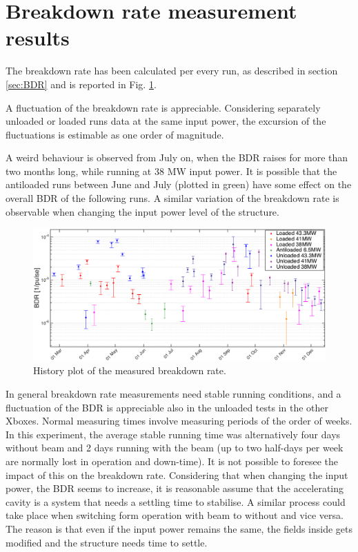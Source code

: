 \section[Breakdown rate measurement results]{Breakdown rate measurement results}

The breakdown rate has been calculated per every run, as described in section \ref{sec:BDR} and is reported in Fig. \ref{BDR_history}. 

A fluctuation of the breakdown rate is appreciable. Considering separately unloaded or loaded runs data at the same input power, the excursion of the fluctuations is estimable as one order of magnitude. 

A weird behaviour is observed from July on, when the BDR raises for more than two months long, while running at 38 MW input power. It is possible that the antiloaded runs between June and July (plotted in green) have some effect on the overall BDR of the following runs. A similar variation of the breakdown rate is observable when changing the input power level of the structure.


\begin{landscape}

\begin{figure}
\centering 
\includegraphics[scale=0.62]{pictures/bdr_hist.png}
\caption{History plot of the measured breakdown rate.}
\label{BDR_history}
\end{figure}
 
\end{landscape}



In general breakdown rate measurements need stable running conditions, and a fluctuation of the BDR is appreciable also in the unloaded tests in the other Xboxes. Normal measuring times involve measuring periods of the order of weeks. In this experiment, the average stable running time was alternatively four days without beam and 2 days running with the beam (up to two half-days per week are normally lost in operation and down-time). It is not possible to foresee the impact of this on the breakdown rate. Considering that when changing the input power, the BDR seems to increase, it is reasonable assume that the accelerating cavity is a system that needs a settling time to stabilise. A similar process could take place when switching form operation with beam to without and vice versa. The reason is that even if the input power remains the same, the fields inside gets modified and the structure needs time to settle. 

